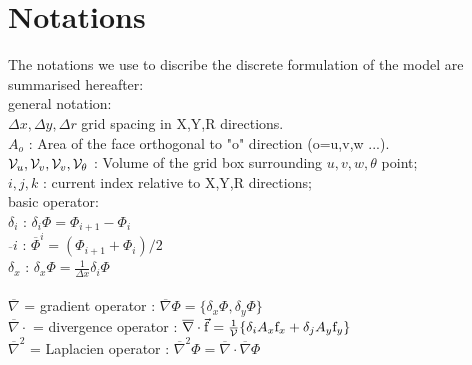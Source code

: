 
\section{Notations} 

The notations we use to discribe the discrete formulation 
of the model are summarised hereafter:\\
general notation:
\\ $\Delta x, \Delta y, \Delta r$ grid spacing in X,Y,R directions.
\\ $A_o$ : Area of the face orthogonal to "o" direction (o=u,v,w ...).
\\ ${\cal V}_u , {\cal V}_v , {\cal V}_v , {\cal V}_\theta$ :
Volume of the grid box surrounding $u,v,w,\theta$ point;
\\ $i,j,k$ : current index relative to X,Y,R directions;
\\basic operator:
\\ $\delta_i $ : $\delta_i \Phi = \Phi_{i+1} - \Phi_i $
\\ $\overline{~}i$ : $\overline{\Phi}^i = ( \Phi_{i+1} + \Phi_i ) / 2 $ 
\\ $\delta_x $ : $\delta_x \Phi = \frac{1}{\Delta x} \delta_i \Phi $
\\
\\ $\overline{\nabla}$ = gradient operator :  
$\overline{\nabla} \Phi = \{ \delta_x \Phi , \delta_y \Phi \}$
\\ $\overline{\nabla} \cdot$ = divergence operator :  
$\overline{\nabla}\cdot \vec{\mathrm{f}}  = 
\frac{1}{\cal V} \{ \delta_i A_x \mathrm{f}_x 
                  + \delta_j A_y \mathrm{f}_y \} $
\\ $\overline{\nabla}^2 $ = Laplacien operator :
$ \overline{\nabla}^2 \Phi = 
   \overline{\nabla}\cdot \overline{\nabla}\Phi $
